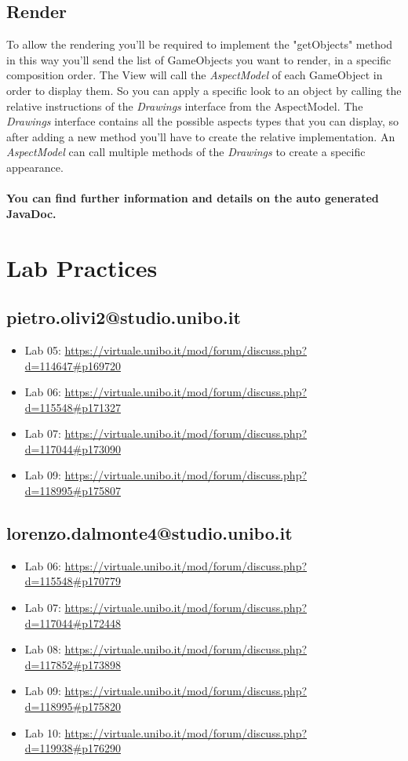 \documentclass[a4paper,12pt]{report}
\begin{document}
\section*{Render}
To allow the rendering you'll be required to implement the "getObjects" method in this way you'll send the list of GameObjects you want to render, in a specific 
composition order. The View will call the \textit{AspectModel} of each GameObject in order to display them. So you can apply a specific look to an object by calling 
the relative instructions of the \textit{Drawings} interface from the AspectModel. The \textit{Drawings} interface contains all the possible aspects types that you 
can display, so after adding a new method you'll have to create the relative implementation. An \textit{AspectModel} can call multiple methods of the \textit{Drawings} 
to create a specific appearance.
\\\\
\textbf{You can find further information and details on the auto generated JavaDoc.}
\chapter{Lab Practices}
\section*{pietro.olivi2@studio.unibo.it}
\begin{itemize}
	\item Lab 05: \url{https://virtuale.unibo.it/mod/forum/discuss.php?d=114647#p169720}
	\item Lab 06: \url{https://virtuale.unibo.it/mod/forum/discuss.php?d=115548#p171327}
	\item Lab 07: \url{https://virtuale.unibo.it/mod/forum/discuss.php?d=117044#p173090}
	\item Lab 09: \url{https://virtuale.unibo.it/mod/forum/discuss.php?d=118995#p175807}
\end{itemize}

\section*{lorenzo.dalmonte4@studio.unibo.it}

\begin{itemize}
	\item Lab 06: \url{https://virtuale.unibo.it/mod/forum/discuss.php?d=115548#p170779}
	\item Lab 07: \url{https://virtuale.unibo.it/mod/forum/discuss.php?d=117044#p172448}
	\item Lab 08: \url{https://virtuale.unibo.it/mod/forum/discuss.php?d=117852#p173898}
	\item Lab 09: \url{https://virtuale.unibo.it/mod/forum/discuss.php?d=118995#p175820}
	\item Lab 10: \url{https://virtuale.unibo.it/mod/forum/discuss.php?d=119938#p176290}
\end{itemize}
\end{document}
